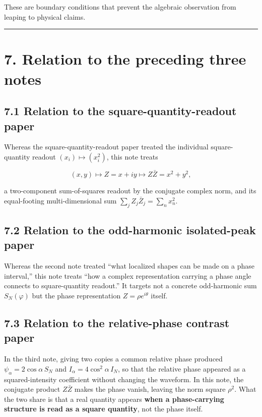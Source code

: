 \documentclass[11pt,a4paper]{article}
\begin{document}
These are boundary conditions that prevent the algebraic observation
from leaping to physical claims.

\begin{center}\rule{0.5\linewidth}{0.5pt}\end{center}

\section{7. Relation to the preceding three
notes}\label{relation-to-the-preceding-three-notes}

\subsection{7.1 Relation to the square-quantity-readout
paper}\label{relation-to-the-square-quantity-readout-paper}

Whereas the square-quantity-readout paper treated the individual
square-quantity readout \((x_i)\longmapsto(x_i^2)\), this note treats

\[
(x,y)\longmapsto Z=x+iy\longmapsto Z\bar Z=x^2+y^2 ,
\]

a two-component sum-of-squares readout by the conjugate complex norm,
and its equal-footing multi-dimensional sum
\(\sum_j Z_j\bar Z_j=\sum_n x_n^2\).

\subsection{7.2 Relation to the odd-harmonic isolated-peak
paper}\label{relation-to-the-odd-harmonic-isolated-peak-paper}

Whereas the second note treated ``what localized shapes can be made on a
phase interval,'' this note treats ``how a complex representation
carrying a phase angle connects to square-quantity readout.'' It targets
not a concrete odd-harmonic sum \(S_N(\varphi)\) but the phase
representation \(Z=\rho e^{i\theta}\) itself.

\subsection{7.3 Relation to the relative-phase contrast
paper}\label{relation-to-the-relative-phase-contrast-paper}

In the third note, giving two copies a common relative phase produced
\(\psi_\alpha=2\cos\alpha\,S_N\) and \(I_\alpha=4\cos^2\alpha\,I_N\), so
that the relative phase appeared as a squared-intensity coefficient
without changing the waveform. In this note, the conjugate product
\(Z\bar Z\) makes the phase vanish, leaving the norm square \(\rho^2\).
What the two share is that a real quantity appears \textbf{when a
phase-carrying structure is read as a square quantity}, not the phase
itself.
\end{document}

